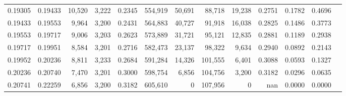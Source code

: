 \begin{tabular}{rrrrrrrrrrrrr}
0.19305 & 0.19433 & 10,520 & 3,222 &                                     0.2345 & 554,919 &  50,691 &  88,718 &  19,238 & 0.2751 & 0.1782 & 0.4696 \\
0.19433 & 0.19553 &  9,964 & 3,200 &                                     0.2431 & 564,883 &  40,727 &  91,918 &  16,038 & 0.2825 & 0.1486 & 0.3773 \\
0.19553 & 0.19717 &  9,006 & 3,203 &                                     0.2623 & 573,889 &  31,721 &  95,121 &  12,835 & 0.2881 & 0.1189 & 0.2938 \\
0.19717 & 0.19951 &  8,584 & 3,201 &                                     0.2716 & 582,473 &  23,137 &  98,322 &   9,634 & 0.2940 & 0.0892 & 0.2143 \\
0.19952 & 0.20236 &  8,811 & 3,233 &                                     0.2684 & 591,284 &  14,326 & 101,555 &   6,401 & 0.3088 & 0.0593 & 0.1327 \\
0.20236 & 0.20740 &  7,470 & 3,201 &                                     0.3000 & 598,754 &   6,856 & 104,756 &   3,200 & 0.3182 & 0.0296 & 0.0635 \\
0.20741 & 0.22259 &  6,856 & 3,200 &                                     0.3182 & 605,610 &       0 & 107,956 &       0 &    nan & 0.0000 & 0.0000 \\
\bottomrule
\end{tabular}
